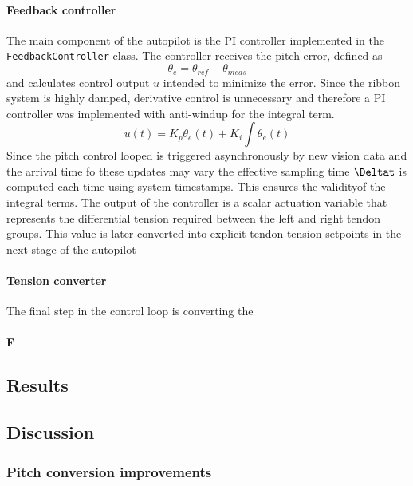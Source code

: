 \paragraph*{Feedback controller}
The main component of the autopilot is the PI controller implemented in the \texttt{FeedbackController} class. The controller receives the pitch error, defined as 
\begin{equation}
    \theta_e = \theta_{ref} - \theta_{meas}
\end{equation}
and calculates control output \(u\) intended to minimize the error. Since the ribbon system is highly damped, derivative control is unnecessary and therefore a PI controller was implemented with anti-windup for the integral term.
\begin{equation}
    u(t) = K_p \theta_e(t) + K_i \int \theta_e(t)
\end{equation}
Since the pitch control looped is triggered asynchronously by new vision data and the arrival time fo these updates may vary the effective sampling time \(\Deltat\) is computed each time using system timestamps. This ensures the validityof the integral terms.
\newline \newline
The output of the controller is a scalar actuation variable that represents the differential tension required between the left and right tendon groups. This value is later converted into explicit tendon tension setpoints in the next stage of the autopilot


\paragraph*{Tension converter}
The final step in the control loop is converting the 

\paragraph*{F}

\subsection{Results}


\subsection{Discussion}

\subsubsection{Pitch conversion improvements}




